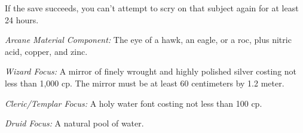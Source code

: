 {	If the save succeeds, you can't attempt to scry on that subject again for at least 24 hours.

	\textit{Arcane Material Component:}
	The eye of a hawk, an eagle, or a roc, plus nitric acid, copper, and zinc.

	\textit{Wizard Focus:}
	A mirror of finely wrought and highly polished silver costing not less than 1,000 cp. The mirror must be at least 60 centimeters by 1.2 meter.

	\textit{Cleric/Templar Focus:}
	A holy water font costing not less than 100 cp.

	\textit{Druid Focus:}
	A natural pool of water.

}
